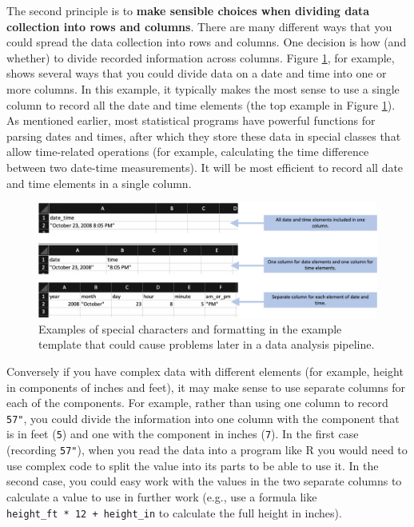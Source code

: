 \documentclass[]{tufte-book}
\begin{document}
The second principle is to \textbf{make sensible choices when dividing data collection
into rows and columns}. There are many different ways that you could spread the
data collection into rows and columns. One decision is how (and whether) to
divide recorded information across columns. Figure \ref{fig:arrangingcolumns},
for example, shows several ways that you could divide data on a date and time
into one or more columns. In this example, it typically makes the most sense to
use a single column to record all the date and time elements (the top example in
Figure \ref{fig:arrangingcolumns}). As mentioned earlier, most statistical
programs have powerful functions for parsing dates and times, after which they
store these data in special classes that allow time-related operations (for
example, calculating the time difference between two date-time measurements). It
will be most efficient to record all date and time elements in a single column.

\begin{figure}
\includegraphics[width=\textwidth]{figures/arranging_columns} \caption[Examples of special characters and formatting in the example template that could cause problems later in a data analysis pipeline]{Examples of special characters and formatting in the example template that could cause problems later in a data analysis pipeline.}\label{fig:arrangingcolumns}
\end{figure}

Conversely if you have complex data with different elements (for example, height
in components of inches and feet), it may make sense to use separate columns for
each of the components. For example, rather than using one column to record
\texttt{5\textquotesingle{}7"}, you could divide the information into one column with the component that
is in feet (\texttt{5}) and one with the component in inches (\texttt{7}). In the first case
(recording \texttt{5\textquotesingle{}7"}), when you read the data into a program like R you would need
to use complex code to split the value into its parts to be able to use it. In
the second case, you could easy work with the values in the two separate columns
to calculate a value to use in further work (e.g., use a formula like \texttt{height\_ft\ *\ 12\ +\ height\_in} to calculate the full height in inches).
\end{document}
